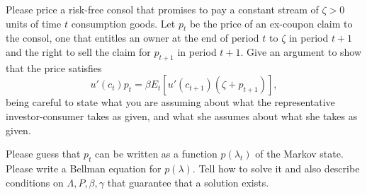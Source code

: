\medskip
%
%
%
%
%

Please price a risk-free consol that promises   to pay a constant stream of  $\zeta> 0$ units of time $t$
consumption goods.  Let $p_t$ be the price of an  ex-coupon claim to the consol, one that entitles an owner at the end of period $t$ to $\zeta$ in period $t+1$ and  the right to sell the claim for $p_{t+1}$ in period $t+1$.
Give an argument to show  that the price satisfies
$$  u'(c_t) p_t
    = \beta E_t \left[ u'(c_{t+1}) (\zeta + p_{t+1}) \right] ,$$
being careful to state what you are assuming about what the representative investor-consumer takes as given, and what she assumes about what she takes as given.

\medskip
{}
Please guess that $p_t$ can be written as a function $p(\lambda_t)$ of the Markov state. Please write a Bellman equation for $p(\lambda)$.  Tell how to solve it and
also  describe conditions on $\Lambda, P, \beta, \gamma$ that guarantee that a solution exists. %

\medskip

